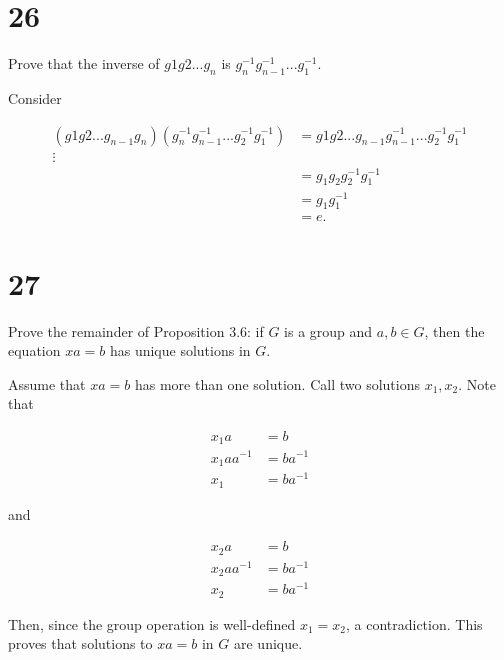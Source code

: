 \documentclass[a4paper]{article}
\begin{document}
\section{}


\section*{26}

Prove that the inverse of $g1 g2 ... g_n$ is $g_n^{-1} g_{n-1}^{-1} ... g_1^{-1}$.

\vspace{\baselineskip}

Consider

\begin{align*}
(g1 g2 ... g_{n-1} g_n) (g_n^{-1} g_{n-1}^{-1} ... g_2^{-1} g_1^{-1}) &= g1 g2 ... g_{n-1} g_{n-1}^{-1} ... g_2^{-1} g_1^{-1} \\
\vdots \\
&= g_1 g_2 g_2^{-1} g_1^{-1} \\
&= g_1 g_1^{-1} \\
&= e.
\end{align*}


\section*{27}

Prove the remainder of Proposition 3.6: if $G$ is a group and $a,b \in G$, then the equation $xa = b$ has unique solutions in $G$.

\vspace{\baselineskip}

Assume that $xa = b$ has more than one solution. Call two solutions $x_1, x_2$. Note that 

\begin{align*}
x_1 a &= b \\
x_1 a a^{-1} &= b a^{-1} \\
x_1 &= b a^{-1}
\end{align*}

and 

\begin{align*}
x_2 a &= b \\
x_2 a a^{-1} &= b a^{-1} \\
x_2 &= b a^{-1}
\end{align*}

Then, since the group operation is well-defined $x_1 = x_2$, a contradiction. This proves that solutions to $xa = b$ in $G$ are unique.
\end{document}
